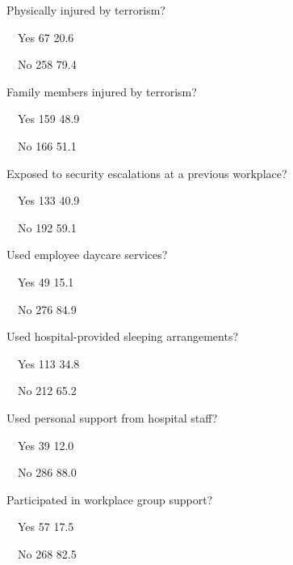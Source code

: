 Physically injured by terrorism?



 Yes                                                                    
67
20.6%

 No                                                                     
258
79.4%

Family members injured by terrorism?



 Yes                                                                    
159
48.9%

 No                                                                     
166
51.1%

Exposed to security escalations at a previous workplace?



 Yes                                                                    
133
40.9%

 No                                                                     
192
59.1%

Used employee daycare services?



 Yes                                                                    
49
15.1%

 No                                                                     
276
84.9%

Used hospital-provided sleeping arrangements?



 Yes                                                                    
113
34.8%

 No                                                                     
212
65.2%

Used personal support from hospital staff?



 Yes                                                                    
39
12.0%

 No                                                                     
286
88.0%

Participated in workplace group support?



 Yes                                                                    
57
17.5%

 No                                                                     
268
82.5%

